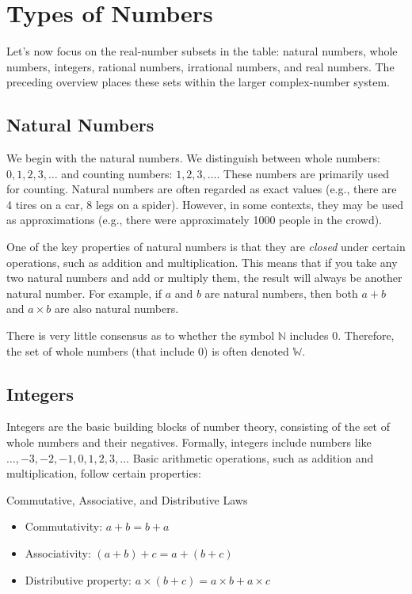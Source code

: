 \section{Types of Numbers}
Let’s now focus on the real-number subsets in the table: natural numbers, whole numbers, integers, rational numbers, irrational numbers, and real numbers. The preceding overview places these sets within the larger complex-number system.

\subsection*{Natural Numbers}
We begin with the natural numbers. We distinguish between whole numbers: $0, 1, 2, 3, \ldots$ and counting numbers: $1, 2, 3, \ldots$. These numbers are primarily used for counting. Natural numbers are often regarded as exact values (e.g., there are 4 tires on a car, 8 legs on a spider). However, in some contexts, they may be used as approximations (e.g., there were approximately 1000 people in the crowd).

One of the key properties of natural numbers is that they are \textit{closed} under certain operations, such as addition and multiplication. This means that if you take any two natural numbers and add or multiply them, the result will always be another natural number. For example, if $a$ and $b$ are natural numbers, then both $a + b$ and $a \times b$ are also natural numbers.

There is very little consensus as to whether the symbol $\mathbb{N}$ includes 0. Therefore, the set of whole numbers (that include 0) is often denoted $\mathbb{W}$.

\subsection*{Integers}
Integers are the basic building blocks of number theory, consisting of the set of whole numbers and their negatives. Formally, integers include numbers like $\ldots,-3,-2,-1,0,1,2,3, \ldots$ Basic arithmetic operations, such as addition and multiplication, follow certain properties:

\begin{custombox}{{Commutative, Associative, and Distributive Laws}}


    \begin{itemize}
    \item Commutativity: $a+b=b+a$
    \item Associativity: $(a+b)+c=a+(b+c)$
    \item Distributive property: $a \times(b+c)=a \times b+a \times c$
    \end{itemize}
    
\end{custombox}

